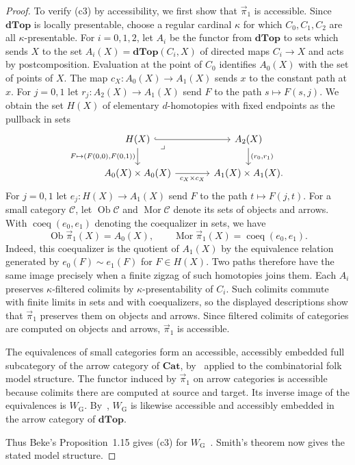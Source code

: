 \documentclass[12pt,a4paper]{amsart}
\theoremstyle{definition}
\renewcommand{\vec}{\overrightarrow}
\newcommand{\D}{\mathbf{dTop}}
\newcommand{\Cat}{\mathbf{Cat}}
\newcommand{\WG}{W_{\mathrm G}}
\newcommand{\cube}[1]{C_{#1}}
\newcommand{\PiC}{\vec{\pi}_1}
\begin{document}
\begin{proof}
To verify \textup{(c3)} by accessibility, we first show that $\PiC$ is accessible. Since $\D$ is locally presentable, choose a regular cardinal $\kappa$ for which $\cube 0,\cube 1,\cube 2$ are all $\kappa$-presentable. For $i=0,1,2$, let $A_i$ be the functor from $\D$ to sets which sends $X$ to the set $A_i(X)=\D(\cube i,X)$ of directed maps $\cube i\to X$ and acts by postcomposition. Evaluation at the point of $\cube0$ identifies $A_0(X)$ with the set of points of $X$. The map $c_X\colon A_0(X)\to A_1(X)$ sends $x$ to the constant path at $x$. For $j=0,1$ let $r_j\colon A_2(X)\to A_1(X)$ send $F$ to the path $s\mapsto F(s,j)$. We obtain the set $H(X)$ of elementary $d$-homotopies with fixed endpoints as the pullback in sets
\[
\begin{tikzcd}[column sep=large]
 H(X)\ar[r,hook]\ar[d,"{F\mapsto(F(0,0),F(0,1))}"']\ar[dr,phantom,"\lrcorner",very near start]& A_2(X)\ar[d,"{(r_0,r_1)}"]\\
 A_0(X)\times A_0(X)\ar[r,"{c_X\times c_X}"'] & A_1(X)\times A_1(X) .
\end{tikzcd}
\]
For $j=0,1$ let $e_j\colon H(X)\to A_1(X)$ send $F$ to the path $t\mapsto F(j,t)$. For a small category $\mathcal C$, let $\operatorname{Ob}\mathcal C$ and $\operatorname{Mor}\mathcal C$ denote its sets of objects and arrows. With $\operatorname{coeq}(e_0,e_1)$ denoting the coequalizer in sets, we have
\[
 \operatorname{Ob}\PiC(X)=A_0(X),\qquad
 \operatorname{Mor}\PiC(X)=\operatorname{coeq}(e_0,e_1).
\]
Indeed, this coequalizer is the quotient of $A_1(X)$ by the equivalence relation generated by $e_0(F)\sim e_1(F)$ for $F\in H(X)$. Two paths therefore have the same image precisely when a finite zigzag of such homotopies joins them. Each $A_i$ preserves $\kappa$-filtered colimits by $\kappa$-presentability of $\cube i$. Such colimits commute with finite limits in sets and with coequalizers, so the displayed descriptions show that $\PiC$ preserves them on objects and arrows. Since filtered colimits of categories are computed on objects and arrows, $\PiC$ is accessible.

The equivalences of small categories form an accessible, accessibly embedded full subcategory of the arrow category of $\Cat$, by~\cite[Theorem~4.1]{MR2506258} applied to the combinatorial folk model structure. The functor induced by $\PiC$ on arrow categories is accessible because colimits there are computed at source and target. Its inverse image of the equivalences is $\WG$. By~\cite[Definition~1.14 and Proposition~1.18]{MR1780498}, $\WG$ is likewise accessible and accessibly embedded in the arrow category of $\D$.

Thus Beke's Proposition~1.15 gives \textup{(c3)} for $\WG$~\cite{MR1780498}. Smith's theorem now gives the stated model structure.
\end{proof}
\end{document}
